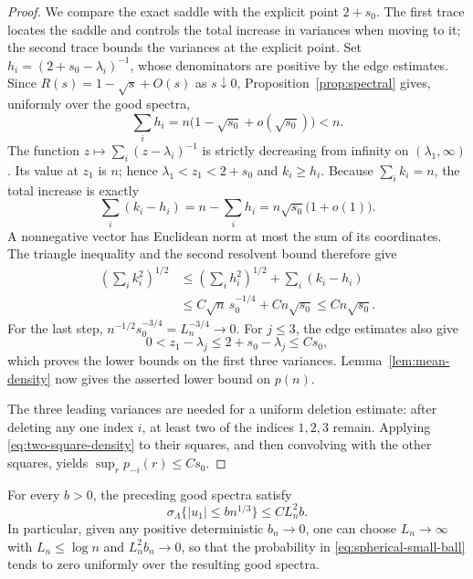 \begin{proof}
We compare the exact saddle with the explicit point $2+s_0$. The first
trace locates the saddle and controls the total increase in variances
when moving to it; the second trace bounds the variances at the explicit
point. Set $h_i=(2+s_0-\lambda_i)^{-1}$,
whose denominators are positive by the edge estimates.  Since
$R(s)=1-\sqrt{s}+O(s)$ as $s\downarrow0$,
Proposition~\ref{prop:spectral} gives, uniformly over the good spectra,
\[
 \sum_i h_i
 =n\bigl(1-\sqrt{s_0}+o(\sqrt{s_0})\bigr)<n.
\]
The function $z\mapsto\sum_i(z-\lambda_i)^{-1}$ is strictly decreasing
from infinity on $(\lambda_1,\infty)$.  Its value at $z_1$ is $n$;
hence $\lambda_1<z_1<2+s_0$ and $k_i\ge h_i$.
Because $\sum_i k_i=n$, the total increase is exactly
\[
 \sum_i(k_i-h_i)
 =n-\sum_i h_i
 =n\sqrt{s_0}\bigl(1+o(1)\bigr).
\]
A nonnegative vector has Euclidean norm at most the sum of its coordinates.
The triangle inequality and the second resolvent bound therefore give
\[
 \begin{split}
 \left(\sum_i k_i^2\right)^{1/2}
 &\le \left(\sum_i h_i^2\right)^{1/2}
       +\sum_i(k_i-h_i)\\
 &\le C\sqrt n\,s_0^{-1/4}+Cn\sqrt{s_0}
 \le Cn\sqrt{s_0}.
 \end{split}
\]
For the last step,
$n^{-1/2}s_0^{-3/4}=L_n^{-3/4}\to0$.
For $j\le3$, the edge estimates also give
\[
 0<z_1-\lambda_j\le2+s_0-\lambda_j\le Cs_0,
\]
which proves the lower bounds on the first three variances.
Lemma~\ref{lem:mean-density} now gives the asserted lower bound on
$p(n)$.

The three leading variances are needed for a uniform deletion
estimate: after deleting any one index $i$, at least two of the
indices $1,2,3$ remain.  Applying \eqref{eq:two-square-density} to their squares,
and then convolving with the other squares, yields
$\sup_r p_{-i}(r)\le Cs_0$.
\end{proof}

\begin{proposition}
\label{prop:spherical-small-ball}
For every $b>0$, the preceding good spectra satisfy
\begin{equation}
\label{eq:spherical-small-ball}
 \sigma_\Lambda\{|u_1|\le b n^{1/3}\}
 \le C L_n^2 b.
\end{equation}
In particular, given any positive deterministic $b_n\to0$, one can
choose $L_n\to\infty$ with $L_n\le\log n$ and $L_n^2b_n\to0$, so that
the probability in \eqref{eq:spherical-small-ball} tends to zero
uniformly over the resulting good spectra.
\end{proposition}

